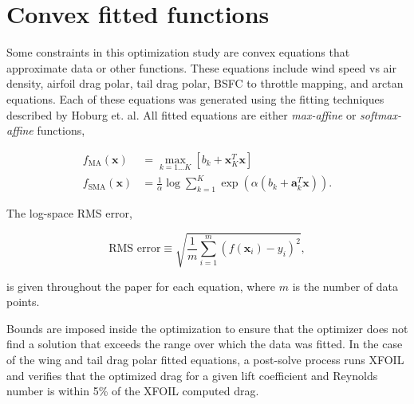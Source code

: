 
\chapter{Convex fitted functions} 

Some constraints in this optimization study are convex equations that approximate data or other functions.  
These equations include wind speed vs air density, airfoil drag polar, tail drag polar, BSFC to throttle mapping, and arctan equations.  
Each of these equations was generated using the fitting techniques described by Hoburg et. al.\cite{fitting} 
All fitted equations are either \emph{max-affine} or \emph{softmax-affine} functions,

\begin{align}
    f_{\text{MA}} (\bm{x}) &= \max\limits_{k=1 \dots K} [b_k + \bm{x}_K^T\bm{x}] \\
    f_{\text{SMA}} (\bm{x}) &= \frac{1}{\alpha} \log{\sum_{k=1}^K \exp{(\alpha(b_k + \bm{a}_k^T \bm{x}))}}.
\end{align}

The log-space RMS error, 

\begin{equation}
\text{RMS error} \equiv \sqrt{\frac{1}{m} \sum_{i=1}^m (f(\bm{x}_i) - y_i)^2},
\end{equation}

 is given throughout the paper for each equation, where $m$ is the number of data points. 

Bounds are imposed inside the optimization to ensure that the optimizer does not find a solution that exceeds the range over which the data was fitted.  In the case of the wing and tail drag polar fitted equations, a post-solve process runs XFOIL and verifies that the optimized drag for a given lift coefficient and Reynolds number is within 5\% of the XFOIL computed drag.
